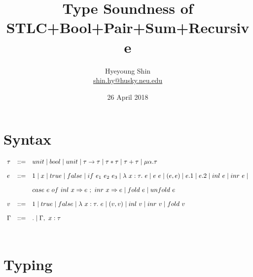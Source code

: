\documentclass{article}
\title{Type Soundness of STLC+Bool+Pair+Sum+Recursive}
\author{Hyeyoung Shin\\
  \url{shin.hy@husky.neu.edu}}
\date{26 April 2018}
\begin{document}

\maketitle

\section{Syntax}

$\begin{array}{l c l}
  \tau & ::= & unit \mid bool \mid unit \mid \tau \rightarrow \tau \mid \tau * \tau \mid \tau + \tau \mid \mu \alpha. \tau\\[1em]
  e    & ::= & 1 \mid x \mid true \mid false \mid if~e_1~e_2~e_3 \mid \lambda~x:\tau.~e \mid e~e \mid (e, e) \mid e.1 \mid e.2 \mid inl~e \mid inr~e \mid\\[1em]
  &    & case~e~of~inl~x \Rightarrow e~;~inr~x \Rightarrow e \mid fold~e \mid unfold~e\\[1em]
  v    & ::= & 1 \mid true \mid false \mid \lambda~x:\tau.~e \mid (v,v) \mid inl~v \mid inr~v \mid fold~v \\[1em]  
  \Gamma & ::= & . \mid \Gamma,~x:\tau\\[2em]
\end{array}$


\section{Typing}
\end{document}
